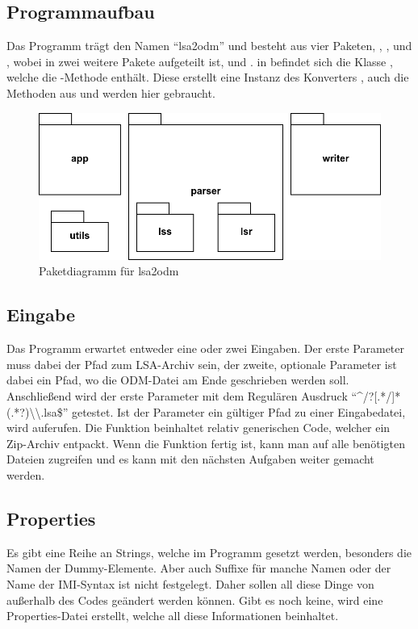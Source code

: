 \subsection{Programmaufbau}

Das Programm trägt den Namen \enquote{lsa2odm} und besteht aus vier Paketen, , ,  und , wobei  in zwei weitere Pakete aufgeteilt ist,  und .
in  befindet sich die Klasse , welche die -Methode enthält.
Diese erstellt eine Instanz des Konverters , auch die Methoden aus  und  werden hier gebraucht.

\begin{figure}[h]
			\centering
			\includegraphics[width=.50\textwidth]{./img/i_package.png}
			\caption{Paketdiagramm für lsa2odm}
\end{figure}

\subsection{Eingabe}

Das Programm erwartet entweder eine oder zwei Eingaben. Der erste Parameter muss dabei der Pfad zum LSA-Archiv sein, der zweite, optionale Parameter ist dabei ein Pfad, wo die ODM-Datei am Ende geschrieben werden soll.
Anschließend wird der erste Parameter mit dem Regulären Ausdruck \enquote{\textasciicircum/?[.*/]*(.*?)\textbackslash\textbackslash.lsa\$} getestet.
Ist der Parameter ein gültiger Pfad zu einer Eingabedatei, wird  auferufen.
Die Funktion beinhaltet relativ generischen Code, welcher ein Zip-Archiv entpackt.
Wenn die Funktion fertig ist, kann man auf alle benötigten Dateien zugreifen und es kann mit den nächsten Aufgaben weiter gemacht werden.

\subsection{Properties}

Es gibt eine Reihe an Strings, welche im Programm gesetzt werden, besonders die Namen der Dummy-Elemente.
Aber auch Suffixe für manche Namen oder der Name der IMI-Syntax ist nicht festgelegt.
Daher sollen all diese Dinge von außerhalb des Codes geändert werden können.
Gibt es noch keine, wird eine Properties-Datei erstellt, welche all diese Informationen beinhaltet.

